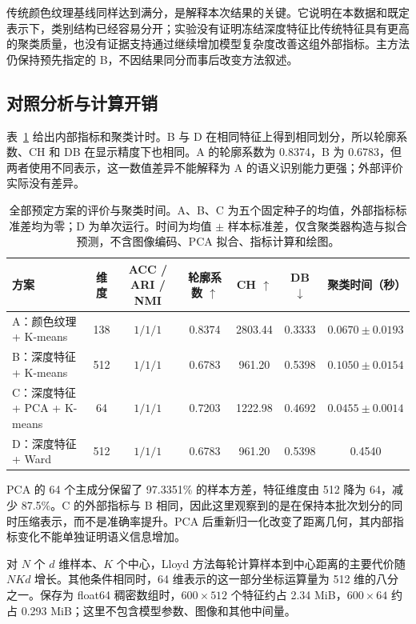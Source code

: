 传统颜色纹理基线同样达到满分，是解释本次结果的关键。它说明在本数据和既定表示下，类别结构已经容易分开；实验没有证明冻结深度特征比传统特征具有更高的聚类质量，也没有证据支持通过继续增加模型复杂度改善这组外部指标。主方法仍保持预先指定的 B，不因结果同分而事后改变方法叙述。

\subsection{对照分析与计算开销}
表~\ref{tab:task1-internal} 给出内部指标和聚类计时。B 与 D 在相同特征上得到相同划分，所以轮廓系数、CH 和 DB 在显示精度下也相同。A 的轮廓系数为 0.8374，B 为 0.6783，但两者使用不同表示，这一数值差异不能解释为 A 的语义识别能力更强；外部评价实际没有差异。

\begin{table}[t]
\caption{全部预定方案的评价与聚类时间。A、B、C 为五个固定种子的均值，外部指标标准差均为零；D 为单次运行。时间为均值 $\pm$ 样本标准差，仅含聚类器构造与拟合预测，不含图像编码、PCA 拟合、指标计算和绘图。}
\label{tab:task1-internal}
\centering
\setlength{\tabcolsep}{4.5pt}
\begin{tabular}{lcccccc}
\toprule
方案 & 维度 & ACC / ARI / NMI & 轮廓系数 $\uparrow$ & CH $\uparrow$ & DB $\downarrow$ & 聚类时间（秒）\\
\midrule
A：颜色纹理 + K-means & 138 & $1/1/1$ & 0.8374 & 2803.44 & 0.3333 & $0.0670\pm0.0193$\\
B：深度特征 + K-means & 512 & $1/1/1$ & 0.6783 & 961.20 & 0.5398 & $0.1050\pm0.0154$\\
C：深度特征 + PCA + K-means & 64 & $1/1/1$ & 0.7203 & 1222.98 & 0.4692 & $0.0455\pm0.0014$\\
D：深度特征 + Ward & 512 & $1/1/1$ & 0.6783 & 961.20 & 0.5398 & 0.4540\\
\bottomrule
\end{tabular}
\end{table}

PCA 的 64 个主成分保留了 97.3351\% 的样本方差，特征维度由 512 降为 64，减少 87.5\%。C 的外部指标与 B 相同，因此这里观察到的是在保持本批次划分的同时压缩表示，而不是准确率提升。PCA 后重新归一化改变了距离几何，其内部指标变化不能单独证明语义信息增加。

对 $N$ 个 $d$ 维样本、$K$ 个中心，Lloyd 方法每轮计算样本到中心距离的主要代价随 $NKd$ 增长。其他条件相同时，64 维表示的这一部分坐标运算量为 512 维的八分之一。保存为 float64 稠密数组时，$600\times512$ 个特征约占 2.34 MiB，$600\times64$ 约占 0.293 MiB；这里不包含模型参数、图像和其他中间量。

